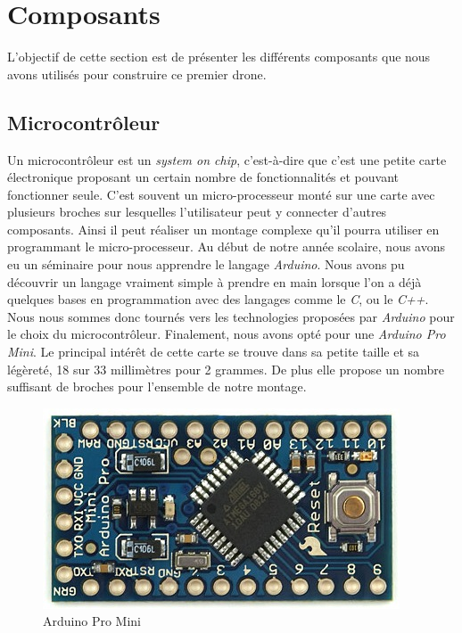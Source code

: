 \documentclass[a4paper,10pt]{report}
\begin{document}
    \section{Composants}
      L'objectif de cette section est de présenter les différents composants 
que nous avons utilisés pour construire ce premier drone.
      
      \subsection{Microcontrôleur}
	Un microcontrôleur est un \textit{system on chip}, c'est-à-dire que 
c'est une petite carte électronique proposant un certain nombre de 
fonctionnalités et pouvant fonctionner seule. C'est souvent un micro-processeur 
monté sur une carte avec plusieurs broches sur lesquelles l'utilisateur peut y 
connecter d'autres composants. Ainsi il peut réaliser un montage complexe qu'il 
pourra utiliser en programmant le micro-processeur.
	Au début de notre année scolaire, nous avons eu un séminaire pour nous 
apprendre le langage \textit{Arduino}. Nous avons pu découvrir un langage 
vraiment simple à prendre en main lorsque l'on a déjà quelques bases en 
programmation avec des langages comme le \textit{C}, ou le \textit{C++}. Nous 
nous sommes donc tournés vers les technologies proposées par \textit{Arduino} 
pour le choix du microcontrôleur. Finalement, nous avons opté pour une 
\textit{Arduino Pro Mini}. Le principal intérêt de cette carte se trouve dans 
sa petite taille et sa légèreté, 18 sur 33 millimètres pour 2 grammes. De plus 
elle propose un nombre suffisant de broches pour l'ensemble de notre montage.
	
	\begin{figure}[htbp]%
	  \centering
	  \includegraphics[scale = 0.3]{img/arduinopromini.jpg}
	  \caption{Arduino Pro Mini}
	  \label{arduinopromini}
	\end{figure}
	
\end{document}
